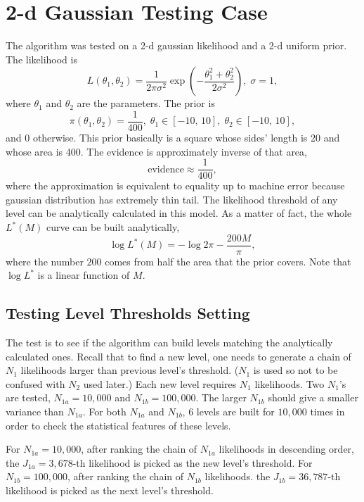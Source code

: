 \documentclass[letterpaper, preprint]{aastex}
\begin{document}
\section{2-d Gaussian Testing Case}
The algorithm was tested on a 2-d gaussian likelihood and a 2-d uniform prior. The likelihood is
\begin{equation}
L(\theta_1,\theta_2)=\frac{1}{2\pi\sigma^2}\exp{\left(-\frac{\theta_1^2+\theta_2^2}{2\sigma^2}\right)},\;\sigma = 1,
\label{eq:likelihood2}
\end{equation}
where $\theta_1$ and $\theta_2$ are the parameters. The prior is
\begin{equation}
\pi(\theta_1,\theta_2) = \frac{1}{400},\;\theta_1\in[-10,\,10],\;\theta_2\in[-10,\,10],
\label{eq:prior2}
\end{equation}
and 0 otherwise. This prior basically is a square whose sides' length is 20 and whose area is 400. The evidence is approximately inverse of that area,
\begin{equation}
\mathrm{evidence} \approx \frac{1}{400},
\end{equation}
where the approximation is equivalent to equality up to machine error because gaussian distribution has extremely thin tail. The likelihood threshold of any level can be analytically calculated in this model. As a matter of fact, the whole $L^*(M)$ curve can be built analytically,
\begin{equation}
\log{L^*(M)}=-\log{2\pi}-\frac{200M}{\pi},
\label{eq:analytical-threshold}
\end{equation}
where the number $200$ comes from half the area that the prior covers. Note that $\log{L^*}$ is a linear function of $M$.

\subsection{Testing Level Thresholds Setting}
The test is to see if the algorithm can build levels matching the analytically calculated ones. Recall that to find a new level, one needs to generate a chain of $N_1$ likelihoods larger than previous level's threshold. ($N_1$ is used so not to be confused with $N_2$ used later.) Each new level requires $N_1$ likelihoods. Two $N_1$'s are tested, $N_{1a} = 10,000$ and $N_{1b} = 100,000$. The larger $N_{1b}$ should give a smaller variance than $N_{1a}$. For both $N_{1a}$ and $N_{1b}$, 6 levels are built  for $10,000$ times in order to check the statistical features of these levels.

For $N_{1a} = 10,000$, after ranking the chain of $N_{1a}$ likelihoods in descending order, the $J_{1a} = 3,678$-th likelihood is picked as the new level's threshold. For $N_{1b} = 100,000$, after ranking the chain of $N_{1b}$ likelihoods. the $J_{1b} = 36,787$-th likelihood is picked as the next level's threshold. 
\end{document}

